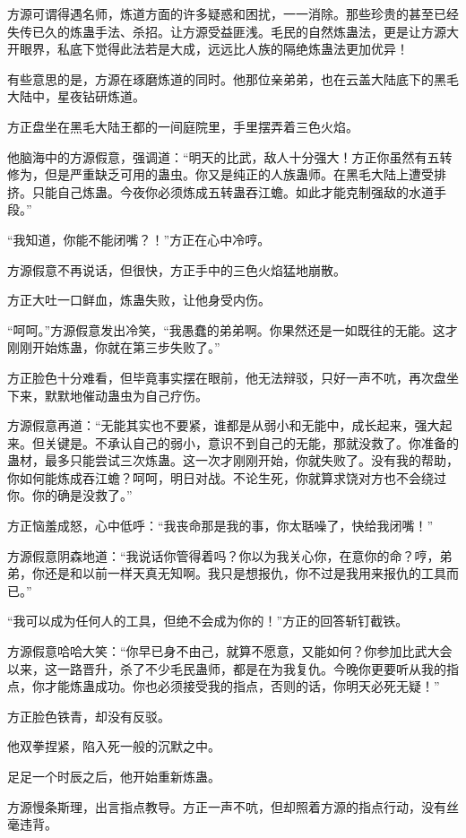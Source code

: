 \begin{this_body}
方源可谓得遇名师，炼道方面的许多疑惑和困扰，一一消除。那些珍贵的甚至已经失传已久的炼蛊手法、杀招。让方源受益匪浅。毛民的自然炼蛊法，更是让方源大开眼界，私底下觉得此法若是大成，远远比人族的隔绝炼蛊法更加优异！

有些意思的是，方源在琢磨炼道的同时。他那位亲弟弟，也在云盖大陆底下的黑毛大陆中，星夜钻研炼道。

方正盘坐在黑毛大陆王都的一间庭院里，手里摆弄着三色火焰。

他脑海中的方源假意，强调道：“明天的比武，敌人十分强大！方正你虽然有五转修为，但是严重缺乏可用的蛊虫。你又是纯正的人族蛊师。在黑毛大陆上遭受排挤。只能自己炼蛊。今夜你必须炼成五转蛊吞江蟾。如此才能克制强敌的水道手段。”

“我知道，你能不能闭嘴？！”方正在心中冷哼。

方源假意不再说话，但很快，方正手中的三色火焰猛地崩散。

方正大吐一口鲜血，炼蛊失败，让他身受内伤。

“呵呵。”方源假意发出冷笑，“我愚蠢的弟弟啊。你果然还是一如既往的无能。这才刚刚开始炼蛊，你就在第三步失败了。”

方正脸色十分难看，但毕竟事实摆在眼前，他无法辩驳，只好一声不吭，再次盘坐下来，默默地催动蛊虫为自己疗伤。

方源假意再道：“无能其实也不要紧，谁都是从弱小和无能中，成长起来，强大起来。但关键是。不承认自己的弱小，意识不到自己的无能，那就没救了。你准备的蛊材，最多只能尝试三次炼蛊。这一次才刚刚开始，你就失败了。没有我的帮助，你如何能炼成吞江蟾？呵呵，明日对战。不论生死，你就算求饶对方也不会绕过你。你的确是没救了。”

方正恼羞成怒，心中低呼：“我丧命那是我的事，你太聒噪了，快给我闭嘴！”

方源假意阴森地道：“我说话你管得着吗？你以为我关心你，在意你的命？哼，弟弟，你还是和以前一样天真无知啊。我只是想报仇，你不过是我用来报仇的工具而已。”

“我可以成为任何人的工具，但绝不会成为你的！”方正的回答斩钉截铁。

方源假意哈哈大笑：“你早已身不由己，就算不愿意，又能如何？你参加比武大会以来，这一路晋升，杀了不少毛民蛊师，都是在为我复仇。今晚你更要听从我的指点，你才能炼蛊成功。你也必须接受我的指点，否则的话，你明天必死无疑！”

方正脸色铁青，却没有反驳。

他双拳捏紧，陷入死一般的沉默之中。

足足一个时辰之后，他开始重新炼蛊。

方源慢条斯理，出言指点教导。方正一声不吭，但却照着方源的指点行动，没有丝毫违背。


\end{this_body}
